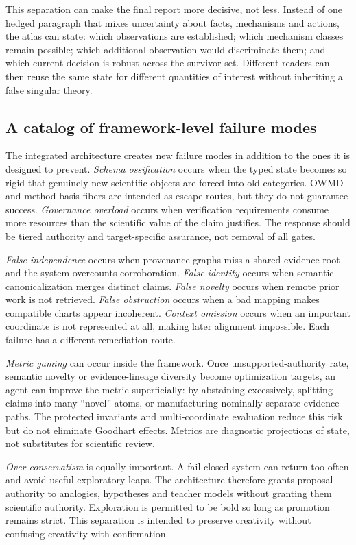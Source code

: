 This separation can make the final report more decisive, not less. Instead of one hedged paragraph that mixes uncertainty about facts, mechanisms and actions, the atlas can state: which observations are established; which mechanism classes remain possible; which additional observation would discriminate them; and which current decision is robust across the survivor set. Different readers can then reuse the same state for different quantities of interest without inheriting a false singular theory.

\subsection{A catalog of framework-level failure modes}

The integrated architecture creates new failure modes in addition to the ones it is designed to prevent. \emph{Schema ossification} occurs when the typed state becomes so rigid that genuinely new scientific objects are forced into old categories. OWMD and method-basis fibers are intended as escape routes, but they do not guarantee success. \emph{Governance overload} occurs when verification requirements consume more resources than the scientific value of the claim justifies. The response should be tiered authority and target-specific assurance, not removal of all gates.

\emph{False independence} occurs when provenance graphs miss a shared evidence root and the system overcounts corroboration. \emph{False identity} occurs when semantic canonicalization merges distinct claims. \emph{False novelty} occurs when remote prior work is not retrieved. \emph{False obstruction} occurs when a bad mapping makes compatible charts appear incoherent. \emph{Context omission} occurs when an important coordinate is not represented at all, making later alignment impossible. Each failure has a different remediation route.

\emph{Metric gaming} can occur inside the framework. Once unsupported-authority rate, semantic novelty or evidence-lineage diversity become optimization targets, an agent can improve the metric superficially: by abstaining excessively, splitting claims into many ``novel'' atoms, or manufacturing nominally separate evidence paths. The protected invariants and multi-coordinate evaluation reduce this risk but do not eliminate Goodhart effects. Metrics are diagnostic projections of state, not substitutes for scientific review.

\emph{Over-conservatism} is equally important. A fail-closed system can return \CannotCheck{} too often and avoid useful exploratory leaps. The architecture therefore grants proposal authority to analogies, hypotheses and teacher models without granting them scientific authority. Exploration is permitted to be bold so long as promotion remains strict. This separation is intended to preserve creativity without confusing creativity with confirmation.

